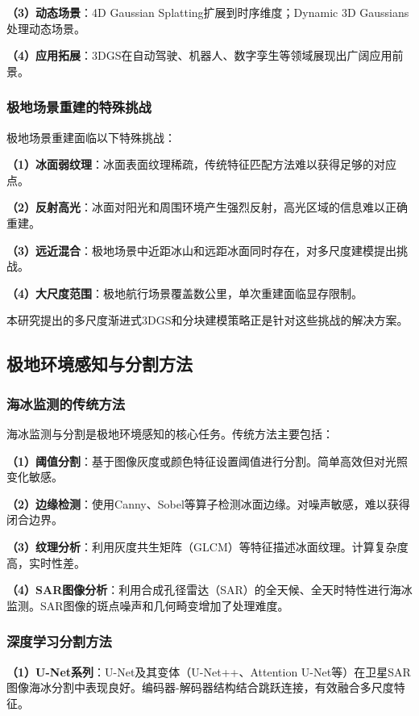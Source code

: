 \documentclass[12pt,a4paper]{ctexbook}
\begin{document}
\textbf{（3）动态场景}：4D Gaussian Splatting扩展到时序维度；Dynamic 3D Gaussians处理动态场景。

\textbf{（4）应用拓展}：3DGS在自动驾驶、机器人、数字孪生等领域展现出广阔应用前景。

\subsubsection{极地场景重建的特殊挑战}

极地场景重建面临以下特殊挑战：

\textbf{（1）冰面弱纹理}：冰面表面纹理稀疏，传统特征匹配方法难以获得足够的对应点。

\textbf{（2）反射高光}：冰面对阳光和周围环境产生强烈反射，高光区域的信息难以正确重建。

\textbf{（3）远近混合}：极地场景中近距冰山和远距冰面同时存在，对多尺度建模提出挑战。

\textbf{（4）大尺度范围}：极地航行场景覆盖数公里，单次重建面临显存限制。

本研究提出的多尺度渐进式3DGS和分块建模策略正是针对这些挑战的解决方案。

\subsection{极地环境感知与分割方法}

\subsubsection{海冰监测的传统方法}

海冰监测与分割是极地环境感知的核心任务。传统方法主要包括：

\textbf{（1）阈值分割}：基于图像灰度或颜色特征设置阈值进行分割。简单高效但对光照变化敏感。

\textbf{（2）边缘检测}：使用Canny、Sobel等算子检测冰面边缘。对噪声敏感，难以获得闭合边界。

\textbf{（3）纹理分析}：利用灰度共生矩阵（GLCM）等特征描述冰面纹理。计算复杂度高，实时性差。

\textbf{（4）SAR图像分析}：利用合成孔径雷达（SAR）的全天候、全天时特性进行海冰监测。SAR图像的斑点噪声和几何畸变增加了处理难度。

\subsubsection{深度学习分割方法}

\textbf{（1）U-Net系列}：U-Net及其变体（U-Net++、Attention U-Net等）在卫星SAR图像海冰分割中表现良好。编码器-解码器结构结合跳跃连接，有效融合多尺度特征。
\end{document}
